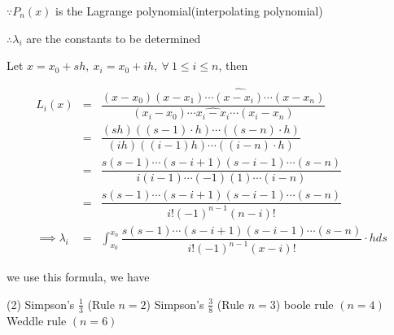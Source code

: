 $\because P_n(x)$ is the Lagrange polynomial(interpolating polynomial)

$\therefore \lambda_i$ are the constants to be determined

Let $x = x_0 + sh,~x_i = x_0 + ih,~\forall~1\leq i \leq n$, then

\begin{eqnarray*}
	L_i(x) &=& \dfrac{(x-x_0)(x-x_1)\cdots \widehat{(x-x_i)}\cdots (x - x_n)}{(x_i-x_0)\cdots \widehat{x_i-x_i}\cdots(x_i-x_n)}\\
	&=& \dfrac{(sh)((s-1)\cdot h)\cdots((s-n)\cdot h)}{(ih)((i-1)h)\cdots((i-n)\cdot h)}\\
	&=& \dfrac{s(s-1)\cdots(s-i+1)(s-i-1)\cdots(s-n)}{i(i-1)\cdots(-1)(1)\cdots(i-n)}\\
	&=& \dfrac{s(s-1)\cdots(s-i+1)(s-i-1)\cdots(s-n)}{i!(-1)^{n-1}(n-i)!}\\
	\implies \lambda_i &=& \int^{x_n}_{x_0} \dfrac{s(s-1)\cdots(s-i+1)(s-i-1)\cdots(s-n)}{i!(-1)^{n-1}(x-i)!}\cdot hds 
\end{eqnarray*}

we use this formula, we have 

\begin{tasks}(2)
	\task[1.] Simpson's $\frac{1}{3}$ (Rule $n=2$)
	\task[2.] Simpson's $\frac{3}{8}$ (Rule $n=3$)
	\task[3.] boole rule $(n=4)$
	\task[4.] Weddle rule $(n=6)$
\end{tasks}


























